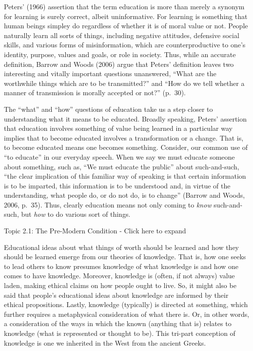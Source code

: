 \documentclass[
]{book}
\begin{document}
Peters' (1966) assertion that the term education is more than merely a synonym for learning is surely correct, albeit uninformative. For learning is something that human beings simpley do regardless of whether it is of moral value or not. People naturally learn all sorts of things, including negative attitudes, defensive social skills, and various forms of misinformation, which are counterproductive to one's identity, purpose, values and goals, or role in society. Thus, while an accurate definition, Barrow and Woods (2006) argue that Peters' definition leaves two interesting and vitally important questions unanswered, ``What are the worthwhile things which are to be transmitted?'' and ``How do we tell whether a manner of transmission is morally accepted or not?'' (p.~30).

The ``what'' and ``how'' questions of education take us a step closer to understanding what it means to be educated. Broadly speaking, Peters' assertion that education involves something of value being learned in a particular way implies that to become educated involves a transformation or a change. That is, to become educated means one becomes something. Consider, our common use of ``to educate'' in our everyday speech. When we say we must educate someone about something, such as, ``We must educate the public'' about such-and-such, ``the clear implication of this familiar way of speaking is that certain information is to be imparted, this information is to be understood and, in virtue of the understanding, what people do, or do not do, is to change'' (Barrow and Woods, 2006, p.~35). Thus, clearly education means not only coming to \emph{know} such-and-such, but \emph{how} to do various sort of things.

Topic 2.1: The Pre-Modern Condition - Click here to expand

Educational ideas about what things of worth should be learned and how they should be learned emerge from our theories of knowledge. That is, how one seeks to lead others to know presumes knowledge of what knowledge is and how one comes to have knowledge. Moreover, knowledge is (often, if not always) value laden, making ethical claims on how people ought to live. So, it might also be said that people's educational ideas about knowledge are informed by their ethical propositions. Lastly, knowledge (typically) is directed at something, which further requires a metaphysical consideration of what there is. Or, in other words, a consideration of the ways in which the known (anything that is) relates to knowledge (what is represented or thought to be). This tri-part conception of knowledge is one we inherited in the West from the ancient Greeks.
\end{document}
